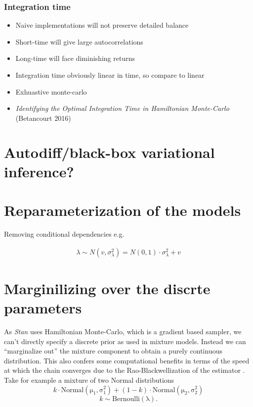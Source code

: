 \documentclass[11pt]{report}
\begin{document}
\subsubsection{Integration time}

\begin{itemize}
\item Naive implementations will not preserve detailed balance
\item Short-time will give large autocorrelations
\item Long-time will face diminishing returns
\item Integration time obviously linear in time, so compare to linear
\item Exhuastive monte-carlo
\item \emph{Identifying the Optimal Integration Time in Hamiltonian Monte-Carlo} (Betancourt 2016)
\end{itemize}

\section{Autodiff/black-box variational inference?}

\section{Reparameterization of the models}

Removing conditional dependencies e.g.

\begin{align*}
\lambda \sim N(v, \sigma^2_\lambda) = N(0, 1) \cdot \sigma_\lambda^2 + v
\end{align*}

\section{Marginilizing over the discrte parameters}

As \emph{Stan} uses Hamiltonian Monte-Carlo, which is a gradient based sampler, we can't directly specify a discrete prior as used in mixture models. Instead we can ``marginalize out'' the mixture component to obtain a purely continuous distribution. This also confers some computational benefits in terms of the speed at which the chain converges due to the Rao-Blackwellization of the estimator \citep{rao}. \\

Take for example a mixture of two Normal distributions
\begin{equation}
  k \cdot \operatorname{Normal(\mu_1, \sigma_1^2)} + (1 - k) \cdot \operatorname{Normal(\mu_2, \sigma_2^2)}
\end{equation} 
\begin{equation}
  k \sim \operatorname{Bernoulli(\lambda)}.
\end{equation}
\end{document}
